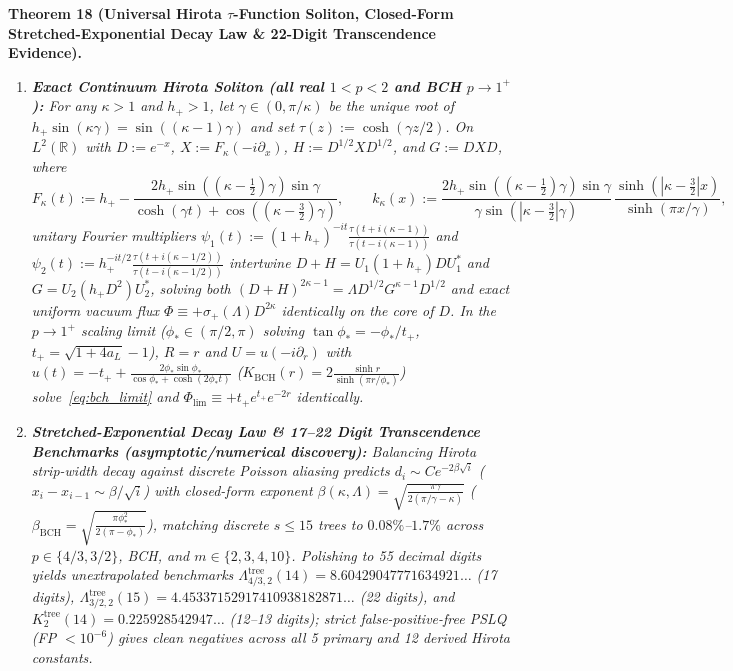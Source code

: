 \documentclass[10pt,letterpaper]{article}
\newcommand{\R}{\mathbb{R}}
\begin{document}
\begin{tcolorbox}[mathbox]
\textbf{Theorem 18 (Universal Hirota $\tau$-Function Soliton, Closed-Form Stretched-Exponential Decay Law \& 22-Digit Transcendence Evidence).}
\begin{enumerate}[label=(\alph*),leftmargin=1.8em,itemsep=2pt,topsep=2pt]
  \item \emph{\textbf{Exact Continuum Hirota Soliton (all real $1 < p < 2$ and BCH $p \to 1^+$):} For any $\kappa > 1$ and $h_+ > 1$, let $\gamma \in (0, \pi/\kappa)$ be the unique root of $h_+ \sin(\kappa\gamma) = \sin((\kappa-1)\gamma)$ and set $\tau(z) := \cosh(\gamma z/2)$. On $L^2(\R)$ with $D := e^{-x}$, $X := F_\kappa(-i\partial_x)$, $H := D^{1/2} X D^{1/2}$, and $G := D X D$, where}
  \[
    F_\kappa(t) := h_+ - \frac{2h_+\sin((\kappa-\tfrac{1}{2})\gamma)\sin\gamma}{\cosh(\gamma t) + \cos((\kappa-\tfrac{3}{2})\gamma)},
    \qquad
    k_\kappa(x) := \frac{2h_+\sin((\kappa-\tfrac{1}{2})\gamma)\sin\gamma}{\gamma\sin(|\kappa-\tfrac{3}{2}|\gamma)}\,\frac{\sinh(|\kappa-\tfrac{3}{2}|x)}{\sinh(\pi x/\gamma)},
  \]
  \emph{unitary Fourier multipliers $\psi_1(t) := (1+h_+)^{-it}\frac{\tau(t+i(\kappa-1))}{\tau(t-i(\kappa-1))}$ and $\psi_2(t) := h_+^{-it/2}\frac{\tau(t+i(\kappa-1/2))}{\tau(t-i(\kappa-1/2))}$ intertwine $D + H = U_1(1+h_+)D U_1^*$ and $G = U_2(h_+ D^2)U_2^*$, solving both $(D+H)^{2\kappa-1} = \Lambda D^{1/2} G^{\kappa-1} D^{1/2}$ and exact uniform vacuum flux $\Phi \equiv +\sigma_+(\Lambda) D^{2\kappa}$ identically on the core of $D$. In the $p \to 1^+$ scaling limit ($\phi_* \in (\pi/2,\pi)$ solving $\tan\phi_* = -\phi_*/t_+$, $t_+ = \sqrt{1+4a_L}-1$), $R = r$ and $U = u(-i\partial_r)$ with $u(t) = -t_+ + \frac{2\phi_*\sin\phi_*}{\cos\phi_* + \cosh(2\phi_* t)}$ ($K_{\mathrm{BCH}}(r) = 2\frac{\sinh r}{\sinh(\pi r/\phi_*)}$) solve~\eqref{eq:bch_limit} and $\Phi_{\lim} \equiv +t_+ e^{t_+} e^{-2r}$ identically.}
  \item \emph{\textbf{Stretched-Exponential Decay Law \& 17--22 Digit Transcendence Benchmarks (asymptotic/numerical discovery):} Balancing Hirota strip-width decay against discrete Poisson aliasing predicts $d_i \sim C e^{-2\beta\sqrt{i}}$ ($x_i - x_{i-1} \sim \beta/\sqrt{i}$) with closed-form exponent $\beta(\kappa, \Lambda) = \sqrt{\frac{\pi\gamma}{2(\pi/\gamma - \kappa)}}$ ($\beta_{\mathrm{BCH}} = \sqrt{\frac{\pi\phi_*^2}{2(\pi-\phi_*)}}$), matching discrete $s \le 15$ trees to $0.08\%$--$1.7\%$ across $p \in \{4/3, 3/2\}$, BCH, and $m \in \{2, 3, 4, 10\}$. Polishing to 55 decimal digits yields unextrapolated benchmarks $\Lambda_{4/3,2}^{\mathrm{tree}}(14) = 8.60429047771634921\dots$ (17 digits), $\Lambda_{3/2,2}^{\mathrm{tree}}(15) = 4.45337152917410938182871\dots$ (22 digits), and $K_2^{\mathrm{tree}}(14) = 0.225928542947\dots$ (12--13 digits); strict false-positive-free PSLQ (FP $< 10^{-6}$) gives clean negatives across all 5 primary and 12 derived Hirota constants.}
\end{enumerate}
\end{tcolorbox}
\end{document}
